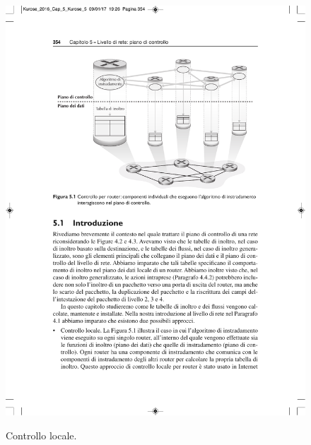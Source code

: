 \documentclass[a4paper]{article}
\begin{document}
	\begin{figure}[!htp]
		\centering
		\includegraphics[width=\textwidth]{img/controllo_locale.pdf}\label{controllo_locale}
		\caption{Controllo locale.}
	\end{figure}
\end{document}
